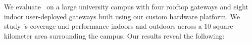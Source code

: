 



We evaluate \name\ on a large university campus with four rooftop gateways and eight indoor user-deployed gateways built using our custom hardware platform. We study \name's coverage and performance indoors and outdoors  across a 10 square kilometer area surrounding the campus. Our results reveal the following:

